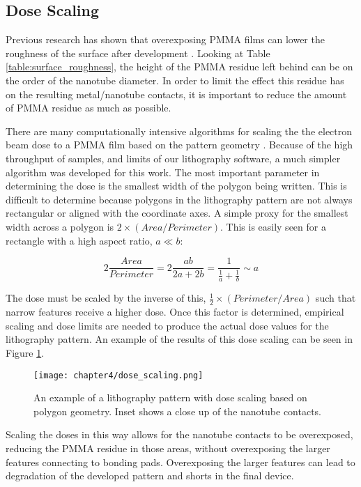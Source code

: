 \subsection{Dose Scaling}

Previous research has shown that overexposing PMMA films can lower the roughness of the surface after development \cite{Macintyre2009, Aurich2012}. Looking at Table \ref{table:surface_roughness}, the height of the PMMA residue left behind can be on the order of the nanotube diameter. In order to limit the effect this residue has on the resulting metal/nanotube contacts, it is important to reduce the amount of PMMA residue as much as possible.

There are many computationally intensive algorithms for scaling the the electron beam dose to a PMMA film based on the pattern geometry \cite{Eisenmann1993, Stirniman1994, Soe2000, Osawa2001}. Because of the high throughput of samples, and limits of our lithography software, a much simpler algorithm was developed for this work. The most important parameter in determining the dose is the smallest width of the polygon being written. This is difficult to determine because polygons in the lithography pattern are not always rectangular or aligned with the coordinate axes. A simple proxy for the smallest width across a polygon is $2\times(Area/Perimeter)$. This is easily seen for a rectangle with a high aspect ratio, $a \ll b$:

\begin{equation}
    \label{eq:dose_scaling}
    2\frac{Area}{Perimeter} = 2\frac{ab}{2a+2b} = \frac{1}{\frac{1}{a}+\frac{1}{b}} \sim a
\end{equation}

The dose must be scaled by the inverse of this, $\frac{1}{2}\times(Perimeter/Area)$ such that narrow features receive a higher dose. Once this factor is determined, empirical scaling and dose limits are needed to produce the actual dose values for the lithography pattern. An example of the results of this dose scaling can be seen in Figure \ref{fig:dose_scaling}.

\begin{figure}
    \centering
    \texttt{[image: chapter4/dose\_scaling.png]}
    \caption{An example of a lithography pattern with dose scaling based on polygon geometry. Inset shows a close up of the nanotube contacts.}
    \label{fig:dose_scaling}
\end{figure}

Scaling the doses in this way allows for the nanotube contacts to be overexposed, reducing the PMMA residue in those areas, without overexposing the larger features connecting to bonding pads. Overexposing the larger features can lead to degradation of the developed pattern and shorts in the final device.

